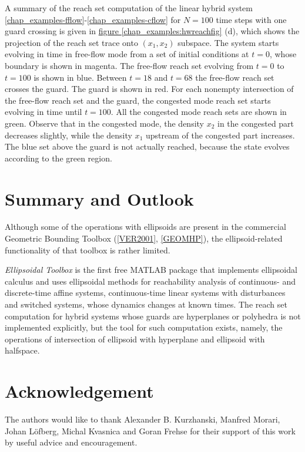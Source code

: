 \documentclass[letterpaper,10pt,english]{sphinxmanual}
\begin{document}
A summary of the reach set computation of the linear hybrid system
\eqref{chap_examples-fflow}-\eqref{chap_examples-cflow} for $N=100$ time steps with one guard crossing
is given in \hyperref[chap_examples:hwreachfig]{figure  \ref*{chap_examples:hwreachfig}} (d), which shows the projection of the
reach set trace onto $(x_1,x_2)$ subspace. The system starts
evolving in time in free-flow mode from a set of initial conditions at
$t=0$, whose boundary is shown in magenta. The free-flow reach set
evolving from $t=0$ to $t=100$ is shown in blue. Between
$t=18$ and $t=68$ the free-flow reach set crosses the guard.
The guard is shown in red. For each nonempty intersection of the
free-flow reach set and the guard, the congested mode reach set starts
evolving in time until $t=100$. All the congested mode reach sets
are shown in green. Observe that in the congested mode, the density
$x_2$ in the congested part decreases slightly, while the density
$x_1$ upstream of the congested part increases. The blue set above
the guard is not actually reached, because the state evolves according
to the green region.


\chapter{Summary and Outlook}
\label{chap_summary::doc}\label{chap_summary:summary-and-outlook}
Although some of the operations with ellipsoids are present in the
commercial Geometric Bounding Toolbox ({\hyperref[chap_summary:ver2001]{{[}VER2001{]}}}, {\hyperref[chap_summary:geomhp]{{[}GEOMHP{]}}}),
the ellipsoid-related functionality of that
toolbox is rather limited.

\emph{Ellipsoidal Toolbox} is the first free MATLAB package that implements
ellipsoidal calculus and uses ellipsoidal methods for reachability
analysis of continuous- and discrete-time affine systems,
continuous-time linear systems with disturbances and switched systems,
whose dynamics changes at known times. The reach set computation for
hybrid systems whose guards are hyperplanes or polyhedra is not
implemented explicitly, but the tool for such computation exists,
namely, the operations of intersection of ellipsoid with hyperplane and
ellipsoid with halfspace.


\chapter{Acknowledgement}
\label{chap_acknowledge::doc}\label{chap_acknowledge:acknowledgement}
The authors would like to thank Alexander B. Kurzhanski, Manfred Morari,
Johan Löfberg, Michal Kvasnica and Goran Frehse for their support of
this work by useful advice and encouragement.
\end{document}
